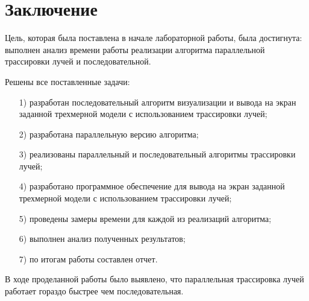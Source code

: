 \chapter*{Заключение}

Цель, которая была поставлена в начале лабораторной работы, была достигнута: выполнен анализ времени работы реализации алгоритма параллельной трассировки лучей и последовательной.

Решены все поставленные задачи: 
\begin{enumerate}
	\item[1)] разработан последовательный алгоритм визуализации и вывода на экран заданной трехмерной модели с использованием трассировки лучей;
\item[2)] разработана параллельную версию алгоритма;
\item[3)] реализованы параллельный и последовательный алгоритмы трассировки лучей;
\item[4)] разработано программное обеспечение для вывода на экран заданной трехмерной модели с использованием трассировки лучей;
\item [5)] проведены замеры времени для каждой из реализаций алгоритма;
\item[6)] выполнен анализ полученных результатов;
\item [7)] по итогам работы составлен отчет.
\end{enumerate}

В ходе проделанной работы было выявлено, что параллельная трассировка лучей работает гораздо быстрее чем последовательная.
